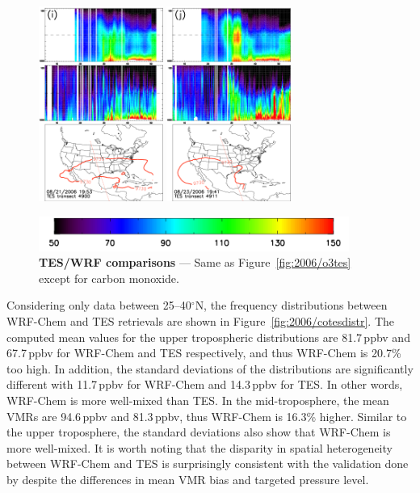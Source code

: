 \begin{figure}
\begin{center}
		\includegraphics[width=1.6in]{co/co_4900_ftuv}
		\includegraphics[width=1.6in]{co/co_4911_ftuv}
		
		\includegraphics[width=4in]{co/co_colorbar}
		\end{center}
	    	\caption[TES/WRF-Chem  comparisons]{\textbf{TES/WRF  comparisons} --- Same as Figure~\ref{fig:2006/o3tes} except for carbon
		monoxide.} \label{fig:2006/cotes}
	\end{figure}

Considering only data between 25--40$^\circ$N, the frequency distributions between WRF-Chem and TES retrievals are shown in Figure~\ref{fig:2006/cotesdistr}. The
computed mean values for the upper tropospheric distributions are 81.7\,\unit{ppbv} and 67.7\,\unit{ppbv} for WRF-Chem and TES respectively, and thus WRF-Chem is
20.7\% too high. In addition, the standard deviations of the distributions are significantly different with 11.7\,\unit{ppbv} for WRF-Chem and 14.3\,\unit{ppbv} for TES. In other words,
WRF-Chem is more well-mixed than TES. In the mid-troposphere, the mean VMRs are 94.6\,\unit{ppbv} and 81.3\,\unit{ppbv}, thus WRF-Chem is 16.3\% higher. Similar
to the upper troposphere, the standard deviations also show that WRF-Chem is more well-mixed. It is worth noting that the disparity in  spatial heterogeneity between
WRF-Chem and TES is surprisingly consistent with the validation done by \citet{Barth:2012qf} despite the differences in mean VMR bias and targeted pressure level.

